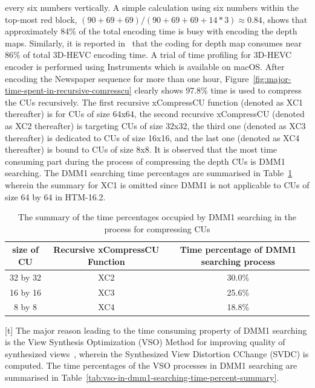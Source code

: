 every six numbers vertically.
A simple calculation using six numbers within the top-most
red block, \((90+69+69)/(90+69+69+14*3) \approx 0.84\), shows that
approximately 84\% of the total encoding time is busy with encoding
the depth maps.
Similarly, it is reported in~\parencite{RN111} that the coding for depth map
consumes near 86\% of total 3D-HEVC encoding time.
A trial of time profiling for 3D-HEVC encoder is performed using Instruments
which is available on macOS.
After encoding the Newspaper sequence for more than one hour,
Figure~\ref{fig:major-time-spent-in-recursive-comresscu} clearly shows
97.8\% time is used to compress the CUs recursively.
The first recursive xCompressCU function (denoted as XC1 thereafter) is
for CUs of size 64x64, the second recursive xCompressCU
(denoted as XC2 thereafter) is targeting CUs of size 32x32,
the third one (denoted as XC3 thereafter) is dedicated
to CUs of size 16x16, and the last one (denoted as XC4 thereafter) is bound
to CUs of size 8x8.
It is observed that the most time consuming part during the process of
compressing the depth CUs is DMM1 searching.
The DMM1 searching time percentages are summarised in
Table~\ref{tab:dmm1-searching-time-percent-summary} wherein the summary
for XC1 is omitted since DMM1 is not applicable to CUs of size 64 by 64 in
HTM-16.2.
\begin{table}[t]
    \caption{The summary of the time percentages occupied by DMM1 searching in the process for compressing CUs}
    \bigskip
    \label{tab:dmm1-searching-time-percent-summary}
    \centering
    \begin{tabular}{c c c}
        \hline
        size of CU & Recursive xCompressCU Function & Time percentage of DMM1 searching process\\
        \hline
        32 by 32  & XC2 & 30.0\% \\
        16 by 16 & XC3 & 25.6\% \\
        8 by 8 & XC4 & 18.8\% \\
        \hline
    \end{tabular}
\end{table}[t]
The major reason leading to the time consuming property of DMM1 searching is the
View Synthesis Optimization (VSO) Method for improving quality of
synthesized views~\parencite{RN124}, wherein the Synthesized View Distortion
CChange (SVDC) is computed.
The time percentages of the VSO processes in DMM1 searching are summarised in
Table~\ref{tab:vso-in-dmm1-searching-time-percent-summary}.
